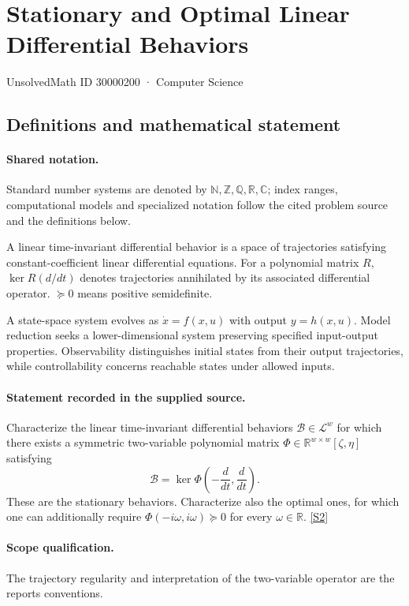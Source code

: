 \documentclass[11pt]{article}
\newcommand{\sref}[2]{\hyperlink{source:#1:#2}{[S#2]}}
\begin{document}
\setcounter{section}{30000199}
\section{Stationary and Optimal Linear Differential Behaviors}\label{30000200}
{\small\sffamily UnsolvedMath ID 30000200 · Computer Science}
\subsection{Definitions and mathematical statement}

\paragraph{Shared notation.}Standard number systems are denoted by $\mathbb N,\mathbb Z,\mathbb Q,\mathbb R,\mathbb C$; index ranges, computational models and specialized notation follow the cited problem source and the definitions below.


A linear time-invariant differential behavior is a space of trajectories satisfying constant-coefficient linear differential equations. For a polynomial matrix $R$, $\ker R(d/dt)$ denotes trajectories annihilated by its associated differential operator. $\succeq0$ means positive semidefinite.

A state-space system evolves as $\dot x=f(x,u)$ with output $y=h(x,u)$. Model reduction seeks a lower-dimensional system preserving specified input-output properties. Observability distinguishes initial states from their output trajectories, while controllability concerns reachable states under allowed inputs.
\paragraph{Statement recorded in the supplied source.}
Characterize the linear time-invariant differential behaviors $\mathcal{B}\in\mathcal{L}^w$ for which there exists a symmetric two-variable polynomial matrix $\Phi\in\mathbb{R}^{w\times w}[\zeta,\eta]$ satisfying $$\mathcal{B}=\ker\Phi\!\left(-\frac{d}{dt},\frac{d}{dt}\right).$$ These are the stationary behaviors. Characterize also the optimal ones, for which one can additionally require $\Phi(-i\omega,i\omega)\succeq0$ for every $\omega\in\mathbb{R}$. \sref{30000200}{2}
\paragraph{Scope qualification.}
The trajectory regularity and interpretation of the two-variable operator are the report\textquotesingle s conventions.
\end{document}
